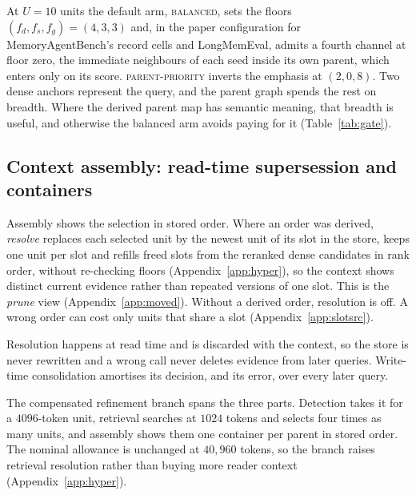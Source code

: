 \documentclass{article}
\newcommand{\balanced}{\textsc{balanced}}
\newcommand{\parprio}{\textsc{parent-priority}}
\begin{document}
At $U{=}10$ units the default arm, \balanced{}, sets the floors $(f_d,f_s,f_g)=(4,3,3)$ and, in the paper configuration for MemoryAgentBench's record cells and LongMemEval, admits a fourth channel at floor zero, the immediate neighbours of each seed inside its own parent, which enters only on its score. \parprio{} inverts the emphasis at $(2,0,8)$. Two dense anchors represent the query, and the parent graph spends the rest on breadth. Where the derived parent map has semantic meaning, that breadth is useful, and otherwise the balanced arm avoids paying for it (Table~\ref{tab:gate}).

\subsection{Context assembly: read-time supersession and containers}\label{sec:resolve}

Assembly shows the selection in stored order. Where an order was derived, \emph{resolve} replaces each selected unit by the newest unit of its slot in the store, keeps one unit per slot and refills freed slots from the reranked dense candidates in rank order, without re-checking floors (Appendix~\ref{app:hyper}), so the context shows distinct current evidence rather than repeated versions of one slot. This is the \emph{prune} view (Appendix~\ref{app:moved}). Without a derived order, resolution is off. A wrong order can cost only units that share a slot (Appendix~\ref{app:slotsrc}).

Resolution happens at read time and is discarded with the context, so the store is never rewritten and a
wrong call never deletes evidence from later queries. Write-time consolidation amortises its decision, and
its error, over every later query.

The compensated refinement branch spans the three parts. Detection takes it for a $4096$-token unit, retrieval searches at $1024$ tokens and selects four times as many units, and assembly shows them one container per parent in stored order. The nominal allowance is unchanged at $40{,}960$ tokens, so the branch raises retrieval resolution rather than buying more reader context (Appendix~\ref{app:hyper}).
\end{document}
